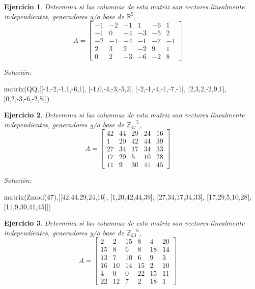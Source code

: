 \documentclass{amsart}
\newtheorem{ejer}{Ejercicio}
\begin{document}


\begin{ejer} Determina si las columnas de esta matriz son vectores linealmente independientes, generadores y/o base de ${{\mathbb R}}^{5}$,
\[ A = \left[\begin{array}{rrrrrr}
-1 & -2 & -1 & 1 & -6 & 1 \\
-1 & 0 & -4 & -3 & -5 & 2 \\
-2 & -1 & -4 & -1 & -7 & -1 \\
2 & 3 & 2 & -2 & 9 & 1 \\
0 & 2 & -3 & -6 & -2 & 8
\end{array}\right] \]
\end{ejer}

{\it Soluci\'on:}

\begin{sageblock}
matrix(QQ,[[-1,-2,-1,1,-6,1],
[-1,0,-4,-3,-5,2],
[-2,-1,-4,-1,-7,-1],
[2,3,2,-2,9,1],
[0,2,-3,-6,-2,8]])
\end{sageblock}



\begin{ejer} Determina si las columnas de esta matriz son vectores linealmente independientes, generadores y/o base de ${{\mathbb Z}_{47}}^{5}$,
\[ A = \left[\begin{array}{rrrrr}
42 & 44 & 29 & 24 & 16 \\
1 & 20 & 42 & 44 & 39 \\
27 & 34 & 17 & 34 & 33 \\
17 & 29 & 5 & 10 & 28 \\
11 & 9 & 30 & 41 & 45
\end{array}\right] \]
\end{ejer}

{\it Soluci\'on:}

\begin{sageblock}
matrix(Zmod(47),[[42,44,29,24,16],
[1,20,42,44,39],
[27,34,17,34,33],
[17,29,5,10,28],
[11,9,30,41,45]])
\end{sageblock}



\begin{ejer} Determina si las columnas de esta matriz son vectores linealmente independientes, generadores y/o base de ${{\mathbb Z}_{23}}^{6}$,
\[ A = \left[\begin{array}{rrrrrr}
2 & 2 & 15 & 8 & 4 & 20 \\
15 & 8 & 6 & 8 & 18 & 14 \\
13 & 7 & 10 & 6 & 9 & 3 \\
16 & 10 & 14 & 15 & 2 & 10 \\
4 & 0 & 0 & 22 & 15 & 11 \\
22 & 12 & 7 & 2 & 18 & 1
\end{array}\right] \]
\end{ejer}
\end{document}
